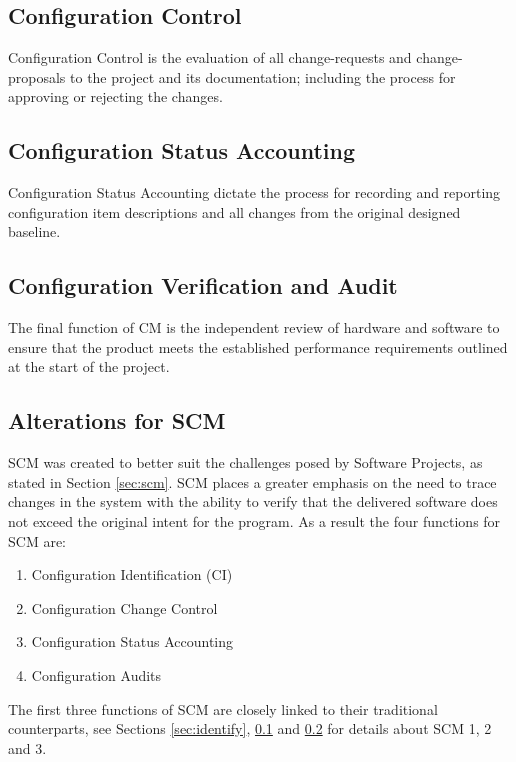 \documentclass[cmpstyle]{ueacmpstyle}
\begin{document}
		\subsection{Configuration Control} \label{sec:control}
		Configuration Control is the evaluation of all change-requests and change-proposals to the project and its documentation; including the process for approving or rejecting the changes.
		
		\subsection{Configuration Status Accounting} \label{sec:accounting}
		Configuration Status Accounting dictate the process for recording and reporting configuration item descriptions and all changes from the original designed baseline.
		
		\subsection{Configuration Verification and Audit} \label{sec:audit}
		The final function of CM is the independent review of hardware and software to ensure that the product meets the established performance requirements outlined at the start of the project.
		
		\subsection{Alterations for SCM} \label{sec:scm-alterations}
		SCM was created to better suit the challenges posed by Software Projects, as stated in Section \ref{sec:scm}. SCM places a greater emphasis on the need to trace changes in the system with the ability to verify that the delivered software does not exceed the original intent for the program. As a result the four functions for SCM are:
		
		\begin{enumerate}
			\item Configuration Identification (CI)
			\item Configuration Change Control
			\item Configuration Status Accounting
			\item Configuration Audits
		\end{enumerate}
	
		The first three functions of SCM are closely linked to their traditional counterparts, see Sections \ref{sec:identify}, \ref{sec:control} and \ref{sec:accounting} for details about SCM 1, 2 and 3. 
		
\end{document}
